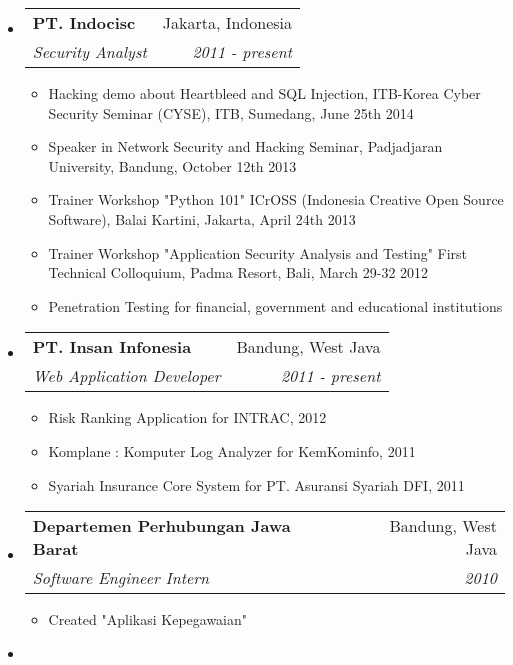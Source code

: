 \documentclass[letterpaper,11pt]{article}
\makeatletter
\newcommand{\resitem}[1]{\item #1 \vspace{-2pt}}
\newcommand{\ressubheading}[4]{

\begin{tabular*}{6.5in}{l@{\cftdotfill{\cftsecdotsep}\extracolsep{\fill}}r}

		\textbf{#1} & #2 \\

		\textit{#3} & \textit{#4} \\

\end{tabular*}\vspace{-6pt}}
\makeatother
\begin{document}
\begin{itemize}

\item

	\ressubheading{PT. Indocisc}{Jakarta, Indonesia}{Security Analyst}{2011 - present}

	\begin{itemize}

    \resitem{Hacking demo about Heartbleed and SQL Injection, ITB-Korea Cyber Security Seminar (CYSE), ITB, Sumedang, June 25th 2014}

		\resitem{Speaker in Network Security and Hacking Seminar, Padjadjaran University, Bandung, October 12th 2013}

		\resitem{Trainer Workshop "Python 101" ICrOSS (Indonesia Creative Open Source Software), Balai Kartini, Jakarta, April 24th 2013}

		\resitem{Trainer Workshop "Application Security Analysis and Testing" First Technical Colloquium, Padma Resort, Bali, March 29-32 2012}

		\resitem{Penetration Testing for financial, government and educational institutions}

	\end{itemize}

\item

	\ressubheading{PT. Insan Infonesia}{Bandung, West Java}{Web Application Developer}{2011 - present}

	\begin{itemize}

    \resitem{Risk Ranking Application for INTRAC, 2012}

    \resitem{Komplane : Komputer Log Analyzer for KemKominfo, 2011}

		\resitem{Syariah Insurance Core System for PT. Asuransi Syariah DFI, 2011}

	\end{itemize}

\item

	\ressubheading{Departemen Perhubungan Jawa Barat}{Bandung, West Java}{Software Engineer Intern}{2010}

	\begin{itemize}

		\resitem{Created "Aplikasi Kepegawaian"}

	\end{itemize}

\item


\end{itemize}
\end{document}
